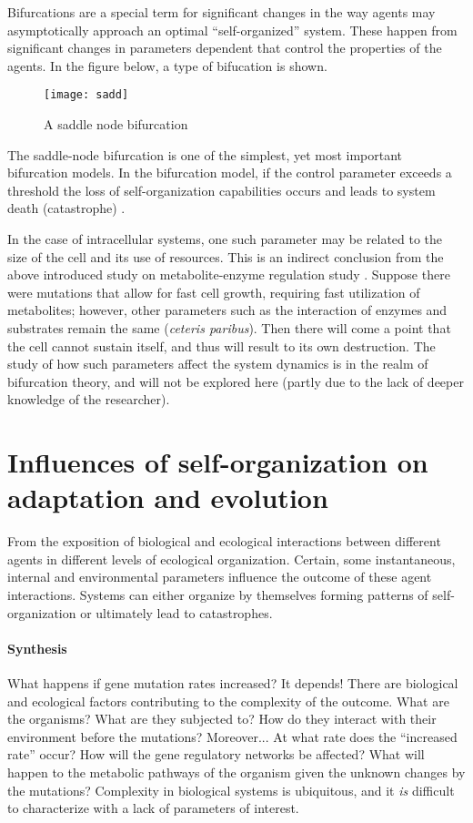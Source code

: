 Bifurcations are a special term for significant changes in the way agents may asymptotically approach an optimal ``self-organized'' system.
These happen from significant changes in parameters dependent that control the properties of the agents.
In the figure below, a type of bifucation is shown.

\begin{figure}[h]
    \centering
    \texttt{[image: sadd]}
    \caption{A saddle node bifurcation}
    \label{fig:sadd}
\end{figure}

The saddle-node bifurcation is one of the simplest, yet most important bifurcation models.
In the bifurcation model, if the control parameter exceeds a threshold the loss of self-organization capabilities occurs and leads to system death (catastrophe) \cite{Devaney}.

In the case of intracellular systems, one such parameter may be related to the size of the cell and its use of resources.
This is an indirect conclusion from the above introduced study on metabolite-enzyme regulation study \cite{Chaves2019}.
Suppose there were mutations that allow for fast cell growth, requiring fast utilization of metabolites; however, other parameters such as the interaction of enzymes and substrates remain the same (\textit{ceteris paribus}).
Then there will come a point that the cell cannot sustain itself, and thus will result to its own destruction.
The study of how such parameters affect the system dynamics is in the realm of bifurcation theory, and will not be explored here (partly due to the lack of deeper knowledge of the researcher).

\section{Influences of self-organization on adaptation and evolution}
From the exposition of biological and ecological interactions between different agents in different levels of ecological organization.
Certain, some instantaneous, internal and environmental parameters influence the outcome of these agent interactions.
Systems can either organize by themselves forming patterns of self-organization or ultimately lead to catastrophes.

\paragraph{Synthesis}
What happens if gene mutation rates increased? It depends!
There are biological and ecological factors contributing to the complexity of the outcome.
What are the organisms? What are they subjected to?
How do they interact with their environment before the mutations?
Moreover... At what rate does the ``increased rate'' occur?
How will the gene regulatory networks be affected?
What will happen to the metabolic pathways of the organism given the unknown changes by the mutations?
Complexity in biological systems is ubiquitous, and it \emph{is} difficult to characterize with a lack of parameters of interest.
